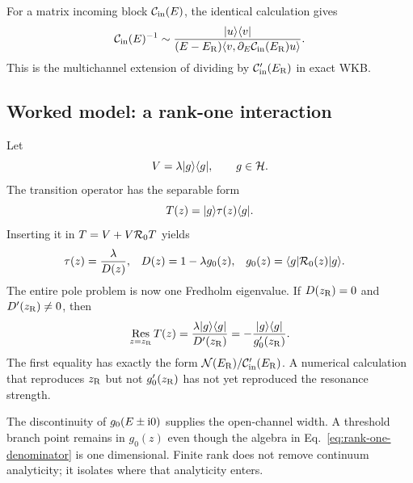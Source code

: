 For a matrix incoming block $\mathcal{C}_{\mathrm{in}}(E)$, the identical
calculation gives
\begin{equation}
  \mathcal{C}_{\mathrm{in}}(E)^{-1}
  \sim
  \frac{\lvert u \rangle\langle v \rvert}
  {(E-E_{\mathrm{R}})
   \langle v,\partial_E\mathcal{C}_{\mathrm{in}}(E_{\mathrm{R}})u\rangle}.
  \label{eq:matrix-connection-residue}
\end{equation}
This is the multichannel extension of dividing by
$\mathcal{C}_{\mathrm{in}}'(E_{\mathrm{R}})$ in exact WKB.

\subsection{Worked model: a rank-one interaction}
\label{subsec:rank-one-fredholm-model}

Let
\begin{equation}
  V=\lambda\lvert g \rangle\langle g \rvert,
  \qquad g\in\mathcal{H} .
  \label{eq:rank-one-potential}
\end{equation}
The transition operator has the separable form
\begin{equation}
  T(z)=\lvert g \rangle\tau(z)\langle g \rvert.
  \label{eq:rank-one-T-ansatz}
\end{equation}
Inserting it in $T=V+V\mathcal{R}_0T$ yields
\begin{align}
  \tau(z)&=\frac{\lambda}{D(z)},
  &D(z)&=1-\lambda g_0(z),
  &g_0(z)&=\langle g|\mathcal{R}_0(z)|g \rangle.
  \label{eq:rank-one-denominator}
\end{align}
The entire pole problem is now one Fredholm eigenvalue.  If
$D(z_{\mathrm{R}})=0$ and $D'(z_{\mathrm{R}})\ne0$, then
\begin{equation}
  \operatorname*{Res}_{z=z_{\mathrm{R}}}T(z)
  =\frac{\lambda\lvert g \rangle\langle g \rvert}{D'(z_{\mathrm{R}})}
  =-\frac{\lvert g \rangle\langle g \rvert}{g_0'(z_{\mathrm{R}})}.
  \label{eq:rank-one-residue}
\end{equation}
The first equality has exactly the form
$\mathcal N(E_{\mathrm{R}})/\mathcal{C}_{\mathrm{in}}'(E_{\mathrm{R}})$.  A numerical
calculation that reproduces $z_{\mathrm{R}}$ but not $g_0'(z_{\mathrm{R}})$
has not yet reproduced the resonance strength.

The discontinuity of $g_0(E\pm\mathrm{i}0)$ supplies the open-channel width.  A
threshold branch point remains in $g_0(z)$ even though the algebra in
Eq.~\eqref{eq:rank-one-denominator} is one dimensional.  Finite rank does not
remove continuum analyticity; it isolates where that analyticity enters.

